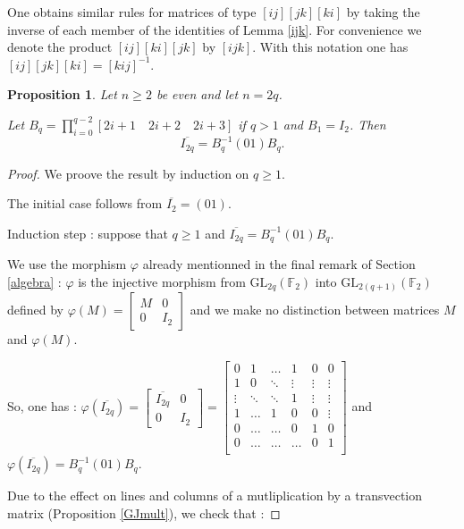 \documentclass[a4paper,12pt,fleqn]{article}
\newcommand\GL[1][n]{\mathrm{GL}_{#1}(\mathbb{F}_2)}
\renewcommand\phi{\varphi}
\renewcommand\geq{\geqslant}
\newtheorem{prop}[theo]{Proposition}
\begin{document}
  One obtains similar rules for matrices of type $[ij][jk][ki]$ by taking the inverse of each member of the identities of Lemma \ref{ijk}.
  For convenience we denote the product $[ij][ki][jk]$ by $[ijk]$. With this notation one has $[ij][jk][ki]=[kij]^{-1}$.


\begin{prop}\label{ibardecprop}
  Let $n\geq  2$ be even and let $n=2q$.

  Let  $B_q=\prod\limits_{i=0}^{q-2}[2i+1\quad 2i+2\quad 2i+3]$ if $q>1$ and $B_1=I_2$. Then
  \begin{equation}\overline{I_{2q}}=B_q^{-1}(01)B_q.\label{ibardec}\end{equation}
  \end{prop}
  



\begin{proof}
  We proove the result by induction on $q\geq  1$.
  
    The initial  case follows from $\overline{I_2}=(01)$.

  Induction step : suppose that $q\geq  1$ and $\overline{I_{2q}}=B_q^{-1}(01)B_q$.

  
  We use the morphism $\phi$ already mentionned in the final remark of Section \ref{algebra} : $\phi$ is the injective morphism from $\GL[2q]$ into $\GL[2(q+1)]$
  defined by
$\phi(M)=\begin{bmatrix}M&0\\0&I_2\end{bmatrix}$ and we make no distinction between matrices $M$ and $\phi(M)$.

So, one has :  
  $\phi(\overline{I_{2q}})=\begin{bmatrix}\overline{I_{2q}}&0\\0&I_2\end{bmatrix}=\begin{bmatrix}
    0&1&\dots&1&0&0\\
    1&0&\ddots&\vdots&\vdots&\vdots\\
    \vdots&\ddots&\ddots&1&\vdots&\vdots\\
    1&\dots&1&0&0&\vdots\\
    0&\dots&\dots&0&1&0\\
    0&\dots&\dots&\dots&0&1\\
  \end{bmatrix}$ and
  $\phi(\overline{I_{2q}})=B_q^{-1}(01)B_q$.

  Due to the effect on lines and columns of a mutliplication by a transvection matrix (Proposition \ref{GJmult}), we check that :


\end{proof}
\end{document}
